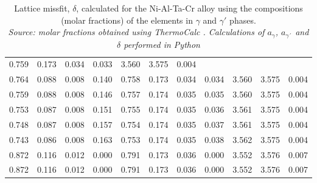 \begin{table}[H]
\begin{tabular}{rrrrrrrrrrr}
0.759 & 0.173 & 0.034 & 0.033 & 3.560 & 3.575 & 0.004 \\0.764 & 0.088 & 0.008 & 0.140 & 0.758 & 0.173 & 0.034 & 0.034 & 3.560 & 3.575 & 0.004 \\0.759 & 0.088 & 0.008 & 0.146 & 0.757 & 0.174 & 0.035 & 0.035 & 3.560 & 3.575 & 0.004 \\0.753 & 0.087 & 0.008 & 0.151 & 0.755 & 0.174 & 0.035 & 0.036 & 3.561 & 3.575 & 0.004 \\0.748 & 0.087 & 0.008 & 0.157 & 0.754 & 0.174 & 0.035 & 0.037 & 3.561 & 3.575 & 0.004 \\0.743 & 0.086 & 0.008 & 0.163 & 0.753 & 0.174 & 0.035 & 0.038 & 3.562 & 3.575 & 0.004 \\0.872 & 0.116 & 0.012 & 0.000 & 0.791 & 0.173 & 0.036 & 0.000 & 3.552 & 3.576 & 0.007 \\0.872 & 0.116 & 0.012 & 0.000 & 0.791 & 0.173 & 0.036 & 0.000 & 3.552 & 3.576 & 0.007
    \end{tabular}
    \caption{\centering Lattice missfit, $\delta$, calculated for the Ni-Al-Ta-Cr alloy using the compositions (molar fractions) of the elements in $\gamma$ and $\gamma'$ phases. \\
    \textit{Source: molar fractions obtained using ThermoCalc \citep{thermocalc}. Calculations of $a_\gamma$, $a_{\gamma´}$ and $\delta$ performed in Python \citep{mygit}} }
    \label{tab:tab08}
\end{table}


